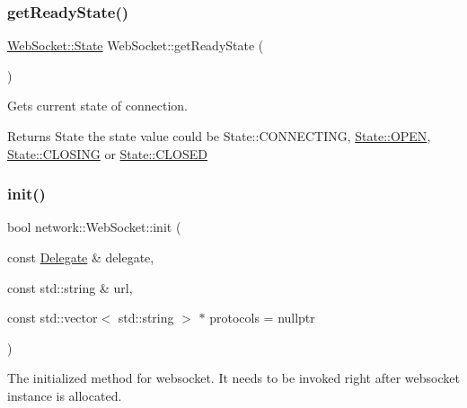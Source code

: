 \subsubsection{\texorpdfstring{get\+Ready\+State()}{getReadyState()}\hspace{0.1cm}{\footnotesize\ttfamily [2/2]}}
{\footnotesize\ttfamily \hyperlink{classnetwork_1_1WebSocket_a60680efaa16031262c8c50409356aa20}{Web\+Socket\+::\+State} Web\+Socket\+::get\+Ready\+State (\begin{DoxyParamCaption}{ }\end{DoxyParamCaption})}



Gets current state of connection. 

\begin{DoxyReturn}{Returns}
State the state value could be State\+::\+C\+O\+N\+N\+E\+C\+T\+I\+NG, \hyperlink{classnetwork_1_1WebSocket_a60680efaa16031262c8c50409356aa20aa38bd5138bf35514df41a1795ebbf5c3}{State\+::\+O\+P\+EN}, \hyperlink{classnetwork_1_1WebSocket_a60680efaa16031262c8c50409356aa20aa71a44c4c886bfc66b1edd511e6a677e}{State\+::\+C\+L\+O\+S\+I\+NG} or \hyperlink{classnetwork_1_1WebSocket_a60680efaa16031262c8c50409356aa20a110ccf2f5d2ff4eda1fd1a494293467d}{State\+::\+C\+L\+O\+S\+ED} 
\end{DoxyReturn}
\mbox{\label{classnetwork_1_1WebSocket_ad5b92ee6f7b6bf4f29e05de51813c05f}} 
\subsubsection{\texorpdfstring{init()}{init()}\hspace{0.1cm}{\footnotesize\ttfamily [1/2]}}
{\footnotesize\ttfamily bool network\+::\+Web\+Socket\+::init (\begin{DoxyParamCaption}\item[{const \hyperlink{classnetwork_1_1WebSocket_1_1Delegate}{Delegate} \&}]{delegate,  }\item[{const std\+::string \&}]{url,  }\item[{const std\+::vector$<$ std\+::string $>$ $\ast$}]{protocols = {\ttfamily nullptr} }\end{DoxyParamCaption})}



The initialized method for websocket. It needs to be invoked right after websocket instance is allocated. 



